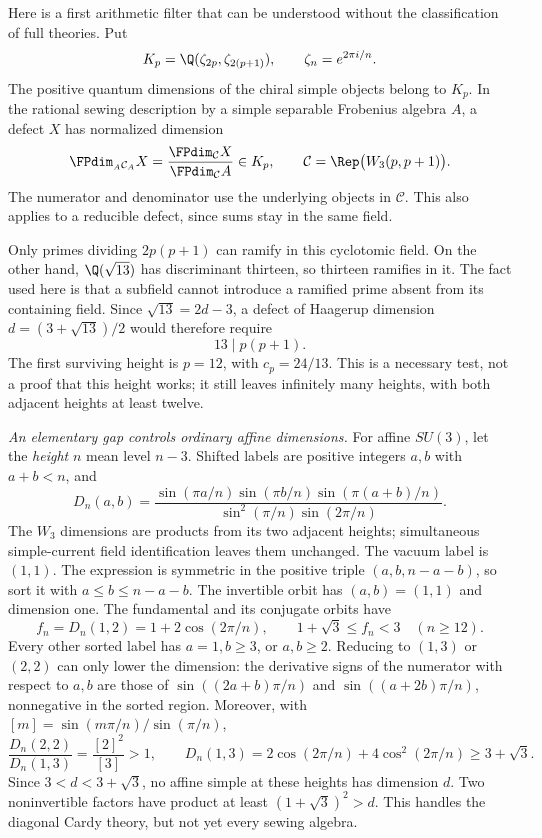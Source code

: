 Here is a first arithmetic filter that can be understood without the
classification of full theories. Put
\[
 K_p=\Q(\zeta_{2p},\zeta_{2(p+1)}),\qquad
 \zeta_n=e^{2\pi i/n}.
\]
The positive quantum dimensions of the chiral simple objects belong to
$K_p$. In the rational sewing description by a simple separable Frobenius
algebra $A$, a defect $X$ has normalized dimension
\[
 \FPdim_{{}_A\mathcal C_A}X
   =\frac{\FPdim_{\mathcal C}X}{\FPdim_{\mathcal C}A}
   \in K_p,
 \qquad \mathcal C=\Rep\bigl(W_3(p,p+1)\bigr).
\]
The numerator and denominator use the underlying objects in
$\mathcal C$. This also applies to a reducible defect, since sums stay
in the same field.

Only primes dividing $2p(p+1)$ can ramify in this cyclotomic field.
On the other hand, $\Q(\sqrt{13})$ has discriminant thirteen, so
thirteen ramifies in it. The fact used here is that a subfield cannot
introduce a ramified prime absent from its containing field. Since
$\sqrt{13}=2d-3$, a defect of Haagerup dimension
$d=(3+\sqrt{13})/2$ would therefore require
\[
 13\mid p(p+1).
\]
The first surviving height is $p=12$, with $c_p=24/13$.
This is a necessary test, not a proof that this height works; it
still leaves infinitely many heights, with both adjacent heights
at least twelve.

\emph{An elementary gap controls ordinary affine dimensions.}
For affine $SU(3)$, let the \emph{height} $n$ mean level $n-3$.
Shifted labels are positive integers $a,b$ with $a+b<n$, and
\[
 D_n(a,b)=\frac{\sin(\pi a/n)\sin(\pi b/n)\sin(\pi(a+b)/n)}
 {\sin^2(\pi/n)\sin(2\pi/n)}.
\]
The $W_3$ dimensions are products from its two adjacent heights;
simultaneous simple-current field identification leaves them unchanged.
The vacuum label is $(1,1)$. The expression is symmetric in the
positive triple $(a,b,n-a-b)$, so sort it with
$a\leq b\leq n-a-b$. The invertible orbit has $(a,b)=(1,1)$ and
dimension one. The fundamental and its conjugate orbits have
\[
 f_n=D_n(1,2)=1+2\cos(2\pi/n),\qquad
 1+\sqrt3\leq f_n<3\quad(n\geq12).
\]
Every other sorted label has $a=1,b\geq3$, or $a,b\geq2$.
Reducing to $(1,3)$ or $(2,2)$ can only lower the dimension:
the derivative signs of the numerator with respect to $a,b$ are those
of $\sin((2a+b)\pi/n)$ and $\sin((a+2b)\pi/n)$, nonnegative in
the sorted region. Moreover, with $[m]=\sin(m\pi/n)/\sin(\pi/n)$,
\[
 \frac{D_n(2,2)}{D_n(1,3)}=\frac{[2]^2}{[3]}>1,\qquad
 D_n(1,3)=2\cos(2\pi/n)+4\cos^2(2\pi/n)\geq3+\sqrt3.
\]
Since $3<d<3+\sqrt3$, no affine simple at these heights has dimension
$d$. Two noninvertible factors have product at least
$(1+\sqrt3)^2>d$. This handles the diagonal Cardy theory, but not
yet every sewing algebra.

